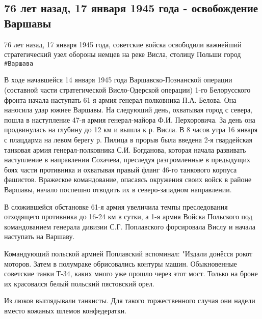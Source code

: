  
 
 
 
 
\subsection{76 лет назад, 17 января 1945 года - освобождение Варшавы}
\label{sec:17_01_2021.fb.storozhenko_denis.1.varshava}

76 лет назад, 17 января 1945 года, советские войска освободили важнейший
стратегический узел обороны немцев на реке Висла, столицу Польши город \verb|#Варшава| 

В ходе начавшейся 14 января 1945 года Варшавско-Познанской операции (составной
части стратегической Висло-Одерской операции) 1-го Белорусского фронта начала
наступать 61-я армия генерал-полковника П.А. Белова. Она наносила удар южнее
Варшавы. На следующий день, охватывая город с севера, пошла в наступление 47-я
армия генерал-майора Ф.И. Перхоровича. За день она продвинулась на глубину до
12 км и вышла к р. Висла. В 8 часов утра 16 января с плацдарма на левом берегу
р. Пилица в прорыв была введена 2-я гвардейская танковая армия
генерал-полковника С.И. Богданова, которая начала развивать наступление в
направлении Сохачева, преследуя разгромленные в предыдущих боях части
противника и охватывая правый фланг 46-го танкового корпуса фашистов. Вражеское
командование, опасаясь окружения своих войск в районе Варшавы, начало поспешно
отводить их в северо-западном направлении. 

В сложившейся обстановке 61-я армия увеличила темпы преследования отходящего
противника до 16-24 км в сутки, а 1-я армия Войска Польского под командованием
генерала дивизии С.Г. Поплавского форсировала Вислу и начала наступать на
Варшаву. 

Командующий польской армией Поплавский вспоминал: "Издали донёсся рокот
моторов. Затем в полумраке обрисовались контуры машин. Обыкновенные советские
танки Т-34, каких много уже прошло через этот мост. Только на броне их
красовался белый польский пястовский орел. 

Из люков выглядывали танкисты. Для такого торжественного случая они надели вместо кожаных шлемов конфедератки. 

